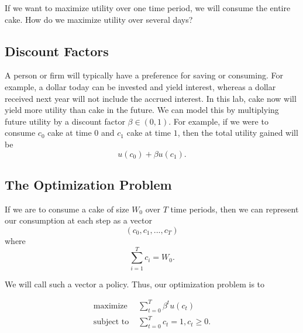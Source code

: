 If we want to maximize utility over one time period, we will consume the entire cake.  How do we maximize utility over several days?

\subsection*{Discount Factors}

A person or firm will typically have a preference for saving or consuming.
For example, a dollar today can be invested and yield interest, whereas a dollar received next year will not include the accrued interest.
In this lab, cake now will yield more utility than cake in the future.
We can model this by multiplying future utility by a discount factor $\beta \in (0,1)$.
For example, if we were to consume $c_0$ cake at time $0$ and $c_1$ cake at time $1$, then the total utility gained will be
\[
u(c_0) + \beta u(c_1).
\]

\subsection*{The Optimization Problem}

If we are to consume a cake of size $W_0$ over $T$ time periods, then we can represent our consumption at each step as a vector
\[
(c_0, c_1, ... , c_T)
\]
where
\[
\sum_{i=1}^T c_i = W_0.
\]

We will call such a vector a policy.  Thus, our optimization problem is to

\begin{align*}
\mbox{maximize }  & \sum_{t=0}^T \beta^t u(c_t) \\
\mbox{subject to } & \sum_{t=0}^T c_t = 1, c_t \geq 0.
\end{align*}


